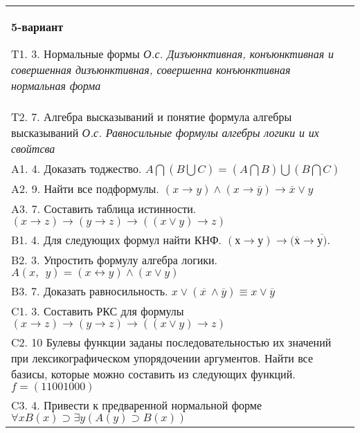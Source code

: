 \documentclass{article}
\begin{document}
\begin{tabular}{m{17cm}}
\textbf{5-вариант}
\newline

T1. 3. Нормальные формы \emph{О.с. Дизъюнктивная, конъюнктивная и совершенная дизъюнктивная, совершенна конъюнктивная нормальная форма} \\
T2. 7. Алгебра высказываний и понятие формула алгебры высказываний \emph{О.с. Равносильные формулы алгебры логики и их свойтсва} \\
A1. 4. Доказать тоджество. \(A\bigcap(B\bigcup C) = (A\bigcap B)\bigcup(B\bigcap C)\) \\
A2. 9. Найти все подформулы. \((x \rightarrow y) \land (x \rightarrow \overline{y}) \rightarrow \overline{x} \vee y\) \\
A3. 7. Составить таблица истинности. \((x \rightarrow z) \rightarrow (y \rightarrow z) \rightarrow ((x \vee y) \rightarrow z)\) \\
B1. 4. Для следующих формул найти КНФ. \((х \rightarrow у) \rightarrow (\overline{х} \rightarrow \overline{у)}\). \\
B2. 3. Упростить формулу алгебра логики. \(A(x,\ \ y) = (x \leftrightarrow y) \land (x \vee y)\) \\
B3. 7. Доказать равносильность. \(x \vee \left( \overline{x\ } \land \overline{y} \right) \equiv x \vee \overline{y}\) \\
C1. 3. Составить РКС для формулы \((x \rightarrow z) \rightarrow (y \rightarrow z) \rightarrow ((x \vee y) \rightarrow z)\) \\
C2. 10 Булевы функции заданы последовательностью их значений при лексикографическом упорядочении аргументов. Найти все базисы, которые можно составить из следующих функций. \(f = (11001000)\) \\
C3. 4. Привести к предваренной нормальной форме \(\forall xB(x) \supset \exists y(A(y) \supset B(x))\) \\

\end{tabular}
\vspace{1cm}
\end{document}
